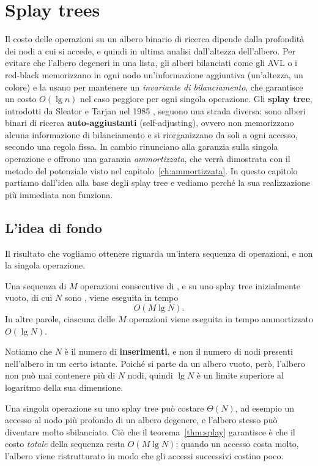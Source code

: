 \chapter{Splay trees}\label{ch:splay}

Il costo delle operazioni su un albero binario di ricerca dipende dalla profondità dei nodi a cui si accede, e quindi in ultima analisi dall'altezza dell'albero. Per evitare che l'albero degeneri in una lista, gli alberi bilanciati come gli AVL o i red-black memorizzano in ogni nodo un'informazione aggiuntiva (un'altezza, un colore) e la usano per mantenere un \emph{invariante di bilanciamento}, che garantisce un costo $O(\lg n)$ nel caso peggiore per ogni singola operazione. Gli \textbf{splay tree}, introdotti da Sleator e Tarjan nel 1985 \cite{Sleator1985-Splay}, seguono una strada diversa: sono alberi binari di ricerca \textbf{auto-aggiustanti} (self-adjusting), ovvero non memorizzano alcuna informazione di bilanciamento e si riorganizzano da soli a ogni accesso, secondo una regola fissa. In cambio rinunciano alla garanzia sulla singola operazione e offrono una garanzia \emph{ammortizzata}, che verrà dimostrata con il metodo del potenziale visto nel capitolo~\ref{ch:ammortizzata}. In questo capitolo partiamo dall'idea alla base degli splay tree e vediamo perché la sua realizzazione più immediata non funziona.

\section{L'idea di fondo}\label{sec:splay-idea}
Il risultato che vogliamo ottenere riguarda un'intera sequenza di operazioni, e non la singola operazione.

\begin{teorema}\label{thm:splay}
Una sequenza di $M$ operazioni consecutive di \Search, \Insert{} e \Delete{} su uno splay tree inizialmente vuoto, di cui $N$ sono \Insert, viene eseguita in tempo
\[
O(M \lg N).
\]
In altre parole, ciascuna delle $M$ operazioni viene eseguita in tempo ammortizzato $O(\lg N)$.
\end{teorema}

Notiamo che $N$ è il numero di \textbf{inserimenti}, e non il numero di nodi presenti nell'albero in un certo istante. Poiché si parte da un albero vuoto, però, l'albero non può mai contenere più di $N$ nodi, quindi $\lg N$ è un limite superiore al logaritmo della sua dimensione.

\begin{osservazione}
Una singola operazione su uno splay tree può costare $\Theta(N)$, ad esempio un accesso al nodo più profondo di un albero degenere, e l'albero stesso può diventare molto sbilanciato. Ciò che il teorema~\ref{thm:splay} garantisce è che il costo \emph{totale} della sequenza resta $O(M\lg N)$: quando un accesso costa molto, l'albero viene ristrutturato in modo che gli accessi successivi costino poco.
\end{osservazione}

